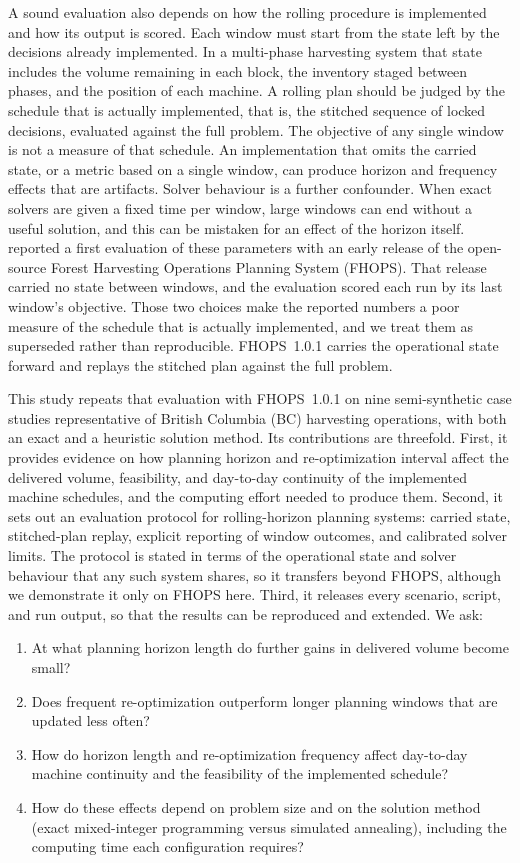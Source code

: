 A sound evaluation also depends on how the rolling procedure is implemented and how its output is
scored. Each window must start from the state left by the decisions already implemented. In a
multi-phase harvesting system that state includes the volume remaining in each block, the
inventory staged between phases, and the position of each machine. A rolling plan should be
judged by the schedule that is actually implemented, that is, the stitched sequence of locked
decisions, evaluated against the full problem. The objective of any single window is not a
measure of that schedule. An implementation that omits the carried state, or a metric based on a
single window, can produce horizon and frequency effects that are artifacts. Solver behaviour is
a further confounder. When exact solvers are given a fixed time per window, large windows can
end without a useful solution, and this can be mistaken for an effect of the horizon itself.
\citet{jaffray2026thesis} reported a first evaluation of these parameters with an early release
of the open-source Forest Harvesting Operations Planning System (FHOPS). That release carried no
state between windows, and the evaluation scored each run by its last window's objective. Those
two choices make the reported numbers a poor measure of the schedule that is actually implemented,
and we treat them as superseded rather than reproducible. FHOPS~1.0.1 \citep{fhops2026v101}
carries the operational state forward and replays the stitched plan against the full problem.

This study repeats that evaluation with FHOPS~1.0.1 \citep{paradis2026fhops} on nine semi-synthetic case
studies representative of British Columbia (BC) harvesting operations, with both an exact and a
heuristic solution method. Its contributions are threefold. First, it provides evidence on how
planning horizon and re-optimization interval affect the delivered volume, feasibility, and
day-to-day continuity of the implemented machine schedules, and the computing effort needed to produce them.
Second, it sets out an evaluation protocol for rolling-horizon planning systems: carried state,
stitched-plan replay, explicit reporting of window outcomes, and calibrated solver limits. The
protocol is stated in terms of the operational state and solver behaviour that any such system
shares, so it transfers beyond FHOPS, although we demonstrate it only on FHOPS here. Third, it releases every scenario,
script, and run output, so that the results can be reproduced and extended. We ask:
\begin{enumerate}
  \item At what planning horizon length do further gains in delivered volume become small?
  \item Does frequent re-optimization outperform longer planning windows that are updated less
        often?
  \item How do horizon length and re-optimization frequency affect day-to-day machine continuity and
        the feasibility of the implemented schedule?
  \item How do these effects depend on problem size and on the solution method (exact
        mixed-integer programming versus simulated annealing), including the computing time each
        configuration requires?
\end{enumerate}
